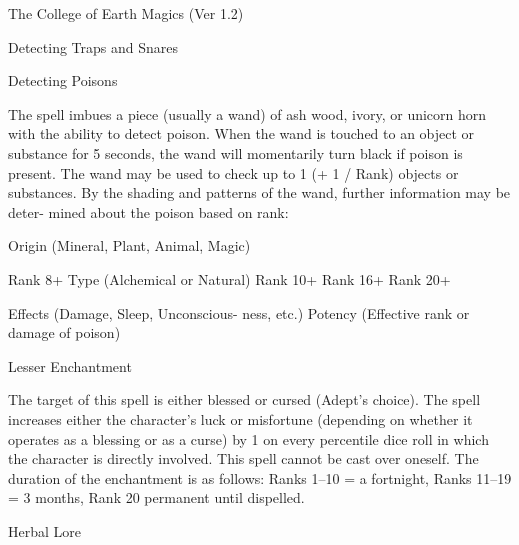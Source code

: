\begin{Chapter}{The College of Earth Magics (Ver 1.2)}
\begin{spell}[G-7]{Detecting Traps and Snares }
\begin{effects}
\end{effects}
\end{spell}

\begin{spell}[G-8]{Detecting Poisons }

\begin{effects}
The spell imbues a piece (usually a wand) 
of ash wood, ivory, or unicorn horn with the ability 
to  detect  poison.  When  the  wand  is  touched  to  an 
object  or  substance  for  5  seconds,  the  wand  will 
momentarily  turn  black  if  poison  is  present.  The 
wand  may  be  used  to  check  up  to  1  (+  1  /  Rank) 
objects  or  substances. By  the  shading  and patterns 
of  the  wand,  further  information  may  be  deter-
mined about the poison based on rank: 

Origin (Mineral, Plant, Animal, Magic) 

Rank 8+  Type (Alchemical or Natural) 
Rank 
10+ 
Rank 
16+ 
Rank 
20+ 

Effects (Damage, Sleep, Unconscious-
ness, etc.) 
Potency (Effective rank or damage of 
poison) 

\end{effects}
\end{spell}

\begin{spell}[G-9]{Lesser Enchantment }

\begin{effects}
The target of this spell is either blessed or 
cursed (Adept’s choice). The spell increases either 
the  character’s  luck  or  misfortune  (depending  on 
whether it operates as a blessing or as a curse) by 1 
on every percentile dice roll in which the character 
is directly involved. This spell cannot be cast over 
oneself.  The  duration  of  the  enchantment  is  as 
follows: Ranks 1–10 = a fortnight, Ranks 11–19 = 
3 months, Rank 20 permanent until dispelled. 

\end{effects}
\end{spell}

\begin{spell}[G-10]{Herbal Lore }


\end{spell}
\end{Chapter}

